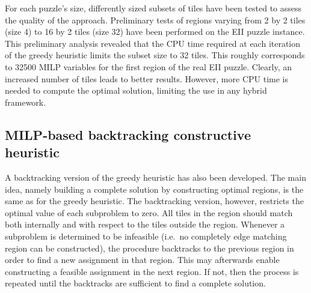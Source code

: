 \documentclass[preprint,12pt]{elsarticle}
\begin{document}
{For each puzzle's size, differently sized subsets of tiles have been tested to assess the quality of the approach.
Preliminary tests of regions varying from 2 by 2 tiles (size 4) to 16 by 2 tiles (size 32) have been performed on the EII puzzle instance. 
This preliminary analysis revealed that the CPU time required at each iteration of the greedy heuristic limits the subset size to 32 tiles. This roughly corresponds to 32500 MILP variables for the first region of the real EII puzzle.
Clearly, an increased number of tiles leads to better results. However, more CPU time is needed to compute the optimal solution, limiting the use in any hybrid framework.

\subsection{MILP-based backtracking constructive heuristic}
\label{subsec:MilpBacktrack}

\noindent
A backtracking version of the greedy heuristic has also been developed.
The main idea, namely building a complete solution by constructing optimal regions, is the same as for the greedy heuristic.
The backtracking version, however, restricts the optimal value of each subproblem to zero. All tiles in the region should match both internally and with respect to the tiles outside the region.
Whenever a subproblem is determined to be infeasible (i.e.\ no completely edge matching region can be constructed), the procedure backtracks to the previous region in order to find
a new assignment in that region.
This may afterwards enable constructing a feasible assignment in the next region.
If not, then the process is repeated until the backtracks are sufficient to find a complete solution. 

}
\end{document}
